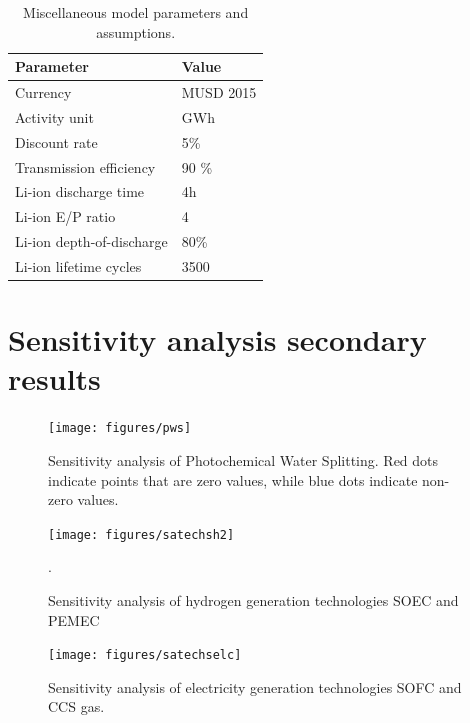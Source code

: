 \begin{table}[H]
\centering
	\caption{Miscellaneous model parameters and assumptions.}
	\vspace{0.1in}
	\begin{tabularx}{0.5\textwidth}{p{} p{}}
		\hline
\textbf{Parameter} & \textbf{Value} \\
\hline
Currency & MUSD 2015 \\
Activity unit & GWh\\
Discount rate & 5\% \\
Transmission efficiency & 90 \% \\
Li-ion discharge time \cite{mongird_energy_2019} & 4h \\
Li-ion E/P ratio \cite{mongird_energy_2019} & 4  \\
Li-ion depth-of-discharge \cite{mongird_energy_2019} & 80\% \\
Li-ion lifetime cycles \cite{mongird_energy_2019} & 3500  \\
\hline 
	\end{tabularx}
\label{misc-assump}
\end{table}

\pagebreak 

\section{Sensitivity analysis secondary results}

\begin{figure}[H] 
\centering
\hspace*{-1cm}
\texttt{[image: figures/pws]}
\caption{Sensitivity analysis of Photochemical Water Splitting. Red dots indicate points that are zero values, while blue dots indicate non-zero values.}
\label{pws}
\end{figure}

\begin{figure}[H] 
\centering
\texttt{[image: figures/satechsh2]}
\caption{Sensitivity analysis of hydrogen generation technologies \gls{SOEC} and \gls{PEMEC}}.
\label{satechs-h2}
\end{figure}

\begin{figure}[H] 
\centering
\texttt{[image: figures/satechselc]}
\caption{Sensitivity analysis of electricity generation technologies \gls{SOFC} and \gls{CCS} gas.}
\label{satechs-elc}
\end{figure}


